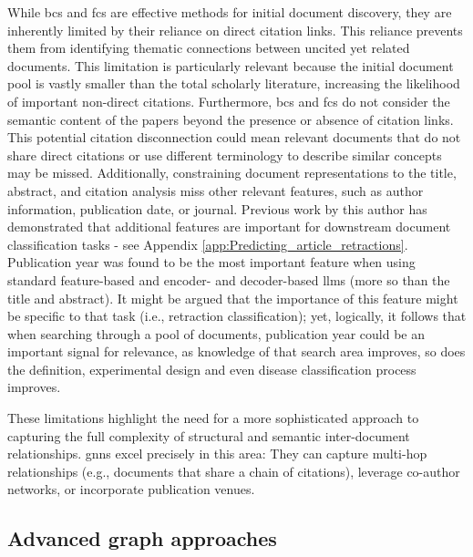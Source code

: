 \documentclass[10pt,oneside]{book}
\begin{document}
While \gls*{bcs} and \gls*{fcs} are effective methods for initial document discovery, they are inherently limited by their reliance on direct citation links. This reliance prevents them from identifying thematic connections between uncited yet related documents. This limitation is particularly relevant because the initial document pool is vastly smaller than the total scholarly literature, increasing the likelihood of important non-direct citations. Furthermore, \gls*{bcs} and \gls*{fcs} do not consider the semantic content of the papers beyond the presence or absence of citation links. This potential citation disconnection could mean relevant documents that do not share direct citations or use different terminology to describe similar concepts may be missed. Additionally, constraining document representations to the title, abstract, and citation analysis miss other relevant features, such as author information, publication date, or journal. Previous work by this author has demonstrated that additional features are important for downstream document classification tasks - see Appendix \ref{app:Predicting_article_retractions}. Publication year was found to be the most important feature when using standard feature-based and encoder- and decoder-based \glspl*{llm} (more so than the title and abstract). It might be argued that the importance of this feature might be specific to that task (i.e., retraction classification); yet, logically, it follows that when searching through a pool of documents, publication year could be an important signal for relevance, as knowledge of that search area improves, so does the definition, experimental design and even disease classification process improves.

These limitations highlight the need for a more sophisticated approach to capturing the full complexity of structural and semantic inter-document relationships. \glspl*{gnn} excel precisely in this area: They can capture multi-hop relationships (e.g., documents that share a chain of citations), leverage co-author networks, or incorporate publication venues.

\subsection{Advanced graph approaches}
\end{document}
